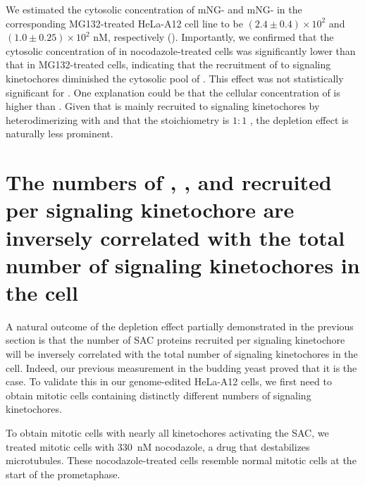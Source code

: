 We estimated the cytosolic concentration of mNG- and mNG- in the corresponding MG132-treated HeLa-A12 cell line to be $(2.4 \pm 0.4) \times 10^2$ and $(1.0 \pm 0.25) \times 10^2$ nM, respectively (). Importantly, we confirmed that the cytosolic concentration of  in nocodazole-treated cells was significantly lower than that in MG132-treated cells, indicating that the recruitment of  to signaling kinetochores diminished the cytosolic pool of . This effect was not statistically significant for . One explanation could be that the cellular concentration of  is higher than . Given that  is mainly recruited to signaling kinetochores by heterodimerizing with  and that the stoichiometry is $1:1$  \cite{BubBiochem}, the depletion effect is naturally less prominent. %


\section{The numbers of , , and  recruited per signaling kinetochore are inversely correlated with the total number of signaling kinetochores in the cell}

A natural outcome of the depletion effect partially demonstrated in the previous section is that the number of SAC proteins recruited per signaling kinetochore will be inversely correlated with the total number of signaling kinetochores in the cell. Indeed, our previous measurement in the budding yeast \cite{Aravamudhan2016} proved that it is the case. To validate this in our genome-edited HeLa-A12 cells, we first need to obtain mitotic cells containing distinctly different numbers of signaling kinetochores.

To obtain mitotic cells with nearly all kinetochores activating the SAC, we treated mitotic cells with \SI{330}{nM} nocodazole, a drug that destabilizes microtubules. These nocodazole-treated cells resemble normal mitotic cells at the start of the prometaphase.

